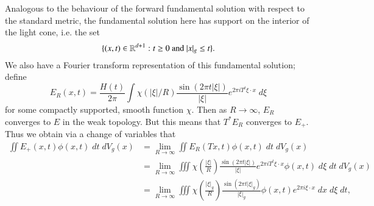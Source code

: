 %
%
%
%
%
%
%
%
%
%
%
%
%
%
%
Analogous to the behaviour of the forward fundamental solution with respect to the standard metric, the fundamental solution here has support on the interior of the light cone, i.e. the set
%
\[ \{ (x,t) \in \RR^{d+1}: t \geq 0\ \text{and}\ |x|_g \leq t \}. \]
%
We also have a Fourier transform representation of this fundamental solution; define
%
\[ E_R(x,t) = \frac{H(t)}{2 \pi} \int \chi( |\xi| / R) \frac{\sin(2 \pi t |\xi|)}{|\xi|} e^{2 \pi i T^t \xi \cdot x}\; d\xi \]
%
for some compactly supported, smooth function $\chi$. Then as $R \to \infty$, $E_R$ converges to $E$ in the weak topology. But this means that $T^* E_R$ converges to $E_+$. Thus we obtain via a change of variables that
%
\begin{align*}
    \iint E_+(x,t) \phi(x,t)\; dt\; dV_g(x) &= \lim_{R \to \infty} \iint E_R(Tx,t) \phi(x,t)\; dt\; dV_g(x)\\
    &= \lim_{R \to \infty} \iiint \chi \left( \frac{|\xi|}{R} \right) \frac{\sin(2 \pi t |\xi|)}{|\xi|} e^{2 \pi i T^t \xi \cdot x} \phi(x,t)\; d\xi\; dt\; dV_g(x)\\
    &= \lim_{R \to \infty} \iiint \chi \left( \frac{|\xi|_g}{R} \right) \frac{\sin(2 \pi t |\xi|_g)}{|\xi|_g} \phi(x,t) e^{2 \pi i \xi \cdot x}\; dx\; d\xi\; dt,
\end{align*}
